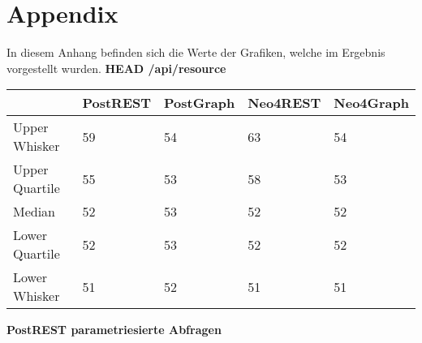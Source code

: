 \chapter*{Appendix} %
\label{sec:appendix}
In diesem Anhang befinden sich die Werte der Grafiken, welche im Ergebnis vorgestellt wurden.
\newline
\textbf{HEAD /api/resource}
\begin{table}[H]
\begin{tabular}{|l|l|l|l|l|}
\hline
               & PostREST & PostGraph & Neo4REST & Neo4Graph \\ \hline
Upper Whisker  & 59       & 54        & 63       & 54        \\ \hline
Upper Quartile & 55       & 53        & 58       & 53        \\ \hline
Median         & 52       & 53        & 52       & 52        \\ \hline
Lower Quartile & 52       & 53        & 52       & 52        \\ \hline
Lower Whisker  & 51       & 52        & 51       & 51        \\ \hline
\end{tabular}
\end{table}
\noindent
\textbf{PostREST parametriesierte Abfragen}

